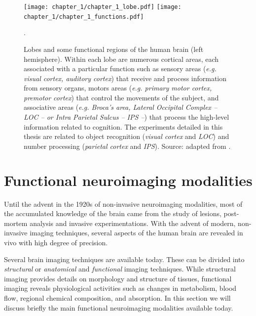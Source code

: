 \begin{figure}
\begin{center}
\center \texttt{[image: chapter\_1/chapter\_1\_lobe.pdf]}
\center \texttt{[image: chapter\_1/chapter\_1\_functions.pdf]}
\end{center}
\caption{Lobes and some functional regions
of the human brain (left hemisphere).
Within each lobe are numerous cortical areas, each associated with a particular function such as
sensory areas (\emph{e.g. visual cortex, auditory cortex}) that receive and
process information from sensory organs, motors areas (\emph{e.g. primary motor
cortex, premotor cortex}) that control the movements of the subject,
and associative areas (\emph{e.g. Broca's area, Lateral Occipital Complex -- LOC
--
or Intra Parietal Sulcus -- IPS --}) that process the high-level information
related to cognition. The experiments detailed in this thesis are related to
object recognition (\emph{visual cortex} and \emph{LOC}) and number processing
(\emph{parietal cortex} and \emph{IPS}). Source: adapted from \citep{michel2010understanding}.}\label{fig:chapter_1_functions}. 
\end{figure}




\section{Functional neuroimaging modalities}

Until the advent in the 1920s of non-invasive neuroimaging modalities, most of the accumulated knowledge of the brain came from the study of lesions, post-mortem analysis and invasive experimentations. With the advent of modern, non-invasive imaging techniques, several aspects of the human brain are revealed in vivo with high degree of precision.

Several brain imaging techniques are available today. These can be divided into \emph{structural} or \emph{anatomical} and \emph{functional} imaging techniques. While structural imaging provides details on morphology and structure of tissues, functional imaging reveals physiological activities such as changes in metabolism, blood flow, regional chemical composition, and absorption. In this section we will discuss briefly the main functional neuroimaging modalities available today.

